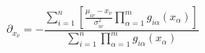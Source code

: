 \documentclass[preview]{standalone}
\begin{document}
\begin{equation}
  \partial_{x_{\nu}} = -\frac{\sum\limits_{i=1}^{n}\left[\frac{\mu_{i\nu}-x_{\nu}}{\sigma^{2}_{i\nu}}\prod\limits_{\alpha=1}^{m}g_{i\alpha}\left( x_{\alpha} \right)\right]}{\sum\limits_{i=1}^{n}\prod\limits_{\alpha=1}^{m}g_{i\alpha}\left( x_{\alpha} \right)}
  \label{eq:bla}
\end{equation}
\end{document}
